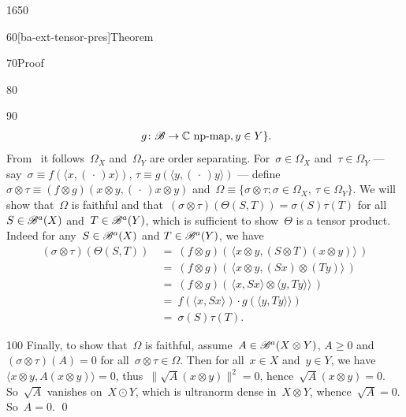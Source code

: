 \begin{parsec}{1650}
\begin{point}{60}[ba-ext-tensor-pres]{Theorem}
\begin{point}{70}{Proof}
\begin{point}{80}
\begin{point}{90}
\begin{align*}
                    \ g \colon \mathscr{B} \to \mathbb{C} \text{ np-map}, y\in Y \}.
    \end{align*}
From~
    it follows~$\Omega_X$  and~$\Omega_Y$ are order separating.
For~$\sigma \in \Omega_X$ and~$\tau \in \Omega_Y$
 --- say~$\sigma \equiv f(\langle x, (\,\cdot\,) x\rangle)$,
    $\tau \equiv g(\langle y, (\,\cdot\,) y\rangle)$ ---
    define~$\sigma \otimes \tau \equiv
        (f \otimes g) (x \otimes y, (\,\cdot\,) x\otimes y) $
        and~$\Omega \equiv \{\sigma \otimes \tau; \sigma \in \Omega_X,
                    \ \tau \in \Omega_Y\}$.
We will show
    that~$\Omega$ is faithful
    and that~$(\sigma \otimes \tau)(\Theta(S,T)) = \sigma(S) \tau(T)$
    for all~$S \in \mathscr{B}^a(X)$ and~$T \in \mathscr{B}^a(Y)$,
    which is sufficient to show~$\Theta$ is a tensor product.
Indeed for any~$S \in \mathscr{B}^a(X)$ and $T \in \mathscr{B}^a(Y)$, we have
\begin{align*}
    (\sigma \otimes \tau)(\Theta(S, T))
        &\ = \ (f \otimes g) (\, \langle x \otimes y, 
                (S \otimes T) (x \otimes y) \rangle\,)\\
        &\ = \ (f \otimes g) (\,\langle x \otimes y, 
                (S x) \otimes (T y)\rangle\,)\\
        &\ = \ (f \otimes g) (\,
            \langle x, Sx\rangle \otimes
            \langle y, Ty\rangle \rangle\,)\\
        &\ = \ 
            f(\langle x, Sx\rangle ) \cdot
            g(\langle y, Ty\rangle \rangle)\\
        &\ = \ 
            \sigma(S) \tau(T).
\end{align*}
\end{point}
\begin{point}{100}%
Finally, to show that~$\Omega$ is faithful,
        assume~$A \in \mathscr{B}^a(X \otimes Y)$, $A \geq 0$
        and $(\sigma \otimes \tau)(A) = 0$
        for all~$\sigma \otimes \tau \in \Omega$.
Then for all~$x \in X$ and~$y \in Y$,
    we have~$\langle x\otimes y, A (x\otimes y)\rangle = 0$,
        thus~$\| \sqrt{A} (x \otimes y) \|^2 = 0$,
        hence~$\sqrt{A} (x \otimes y) = 0$.
So~$\sqrt{A}$ vanishes on~$X \odot Y$,
    which is ultranorm dense in~$X \otimes Y$,
    whence~$\sqrt{A} = 0$. So~$A = 0$.
\qed
\end{point}
\end{point}
\end{point}
\end{point}
\end{parsec}


